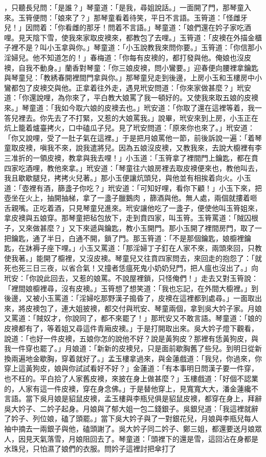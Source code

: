 \begin{showcontents}{}
，只聽長兒問：「是誰？」琴童道：「是我，尋姐說話。」一面開了門，那琴童入來。玉筲便問：「娘來了？」那琴童看着待笑，平日不言語。玉筲道：「怪雌牙兒！」因問着：「你看雌的那牙！問着不言語。」琴童道：「娘們還在妗子家吃酒哩。見天陰下雪，使我來家取皮襖來，都教包了去哩。」玉筲道：「皮襖在外描金櫃子裡不是？叫小玉拿與你。」琴童道：「小玉說教我來問你要。」玉筲道：「你信那小淫婦兒。他不知道怎的！」春梅道：「你每有皮襖的，都打發與他。俺娘也沒皮襖，自我不動身。」蘭香對琴童：「你三娘皮襖，問小鸞要。」迎春便向腰裡拿鑰匙與琴童兒：「教綉春開裡間門拿與你。」那琴童兒走到後邊，上房小玉和玉樓房中小鸞都包了皮襖交與他。正拿着往外走，遇見玳安問道：「你來家做甚麼？」玳安道：「你還說哩，為你來了，平白教大娘罵了我一頓好的。又使我來取五娘的皮襖來。」琴童道：「我如今取六娘的皮襖去也。」玳安道：「你取了還在這裡等着，我一答兒裡去。你先去了不打緊，又惹的大娘罵我。」說畢，玳安來到上房，小玉正在炕上籠着爐臺拷火，口中磕瓜子兒。見了玳安問道：「原來你也來了。」玳安道：「你又說哩，受了一肚子氣在這裡。」于是把月娘罵他一節，前後訴說一遍：「着琴童取皮襖，嗔我不來，說我遣將兒。因為五娘沒皮襖，又教我來，去說大櫥裡有李三准折的一領皮襖，教拿與我去哩！」小玉道：「玉筲拿了裡間門上鑰匙，都在賁四家吃酒哩，教他來拿。」玳安道：「琴童往六娘房裡去取皮襖便來也，教他叫去，我且歇歇腿兒，拷拷火兒著。」那小玉便讓炕頭兒，與他並有相挨着向火。小玉道：「壺裡有酒，篩盞子你吃？」玳安道：「可知好哩，看你下顧！」小玉下來，把壺坐在火上，抽開抽梯，拿了一盞子臘鵝肉 ，篩酒與他。無人處，兩個就摟着咂舌親嘴。正吃着酒，只見琴童兒進來。玳安讓他吃了一盞子，便使他叫玉筲姐來，拿皮襖與五娘穿。那琴童把毡包放下，走到賁四家，叫玉筲。玉筲罵道：「賊囚根子，又來做甚麼？」又下來遞與鑰匙，教小玉開門。那小玉開了裡間房門，取了一把鑰匙，通了半日，白通不開，鎖了門。那玉筲道：「不是那個鑰匙，娘櫥裡鑰匙，在牀褥子座下哩。」小玉又罵道：「那淫婦丁子釘在人家不來，兩頭來回，只教使我著。」能開了櫥裡，又沒皮襖。琴童兒又往賁四家問去，來回走的抱怨了：「就死也死三日三夜，以省合氣！又撞者恁瘟死鬼小奶奶兒門，把人瘟也沒出了。」向玳安：「你說此回去，又惹的娘罵。不說屋裡鎖，只怪俺們！」走去又對玉筲說：「裡間娘櫥裡尋，沒有皮襖。」玉筲想了想笑道：「我也忘記，在外間大櫥裡。」到後邊，又被小玉罵道：「淫婦吃那野漢子搗昏了，皮襖在這裡都到處尋。」一面取出來，將皮襖包了，連大姐披襖，都交付與玳安、琴童兩個，拿到吳大妗子家。月娘又罵道：「賊奴才，你說同了，都不來罷了！」那玳安又不敢言語。琴童道：「娘的皮襖都有了，等着姐又尋這件青廂皮襖。」于是打開取出來。吳大妗子燈下觀看，說道：「也好一件皮襖，五娘你怎的說他不好？說是黃狗皮？那裡有恁黃狗皮，與我一件穿也罷了。」月娘道：「新新的皮襖兒，只是面前歇胸舊了些兒。到明日從新換兩遍地金歇胸，穿着就好了。」孟玉樓拿過來，與金蓮戲道：「我兒，你過來，你穿上這黃狗皮，娘與你試試看好不好？」金蓮道：「有本事明日問漢子要一件穿，也不枉的。平白拾了人家舊皮襖，來披在身上做甚麼？」玉樓戲道：「好個不認業的，人家有這一件皮襖，穿在身念佛。」于是替他穿上，見寬寬大大，潘金蓮纔不言語。當下吳月娘是貂鼠皮襖，孟玉樓與李瓶兒俱是貂鼠皮襖，都穿在身上，拜辭吳大妗子、二妗子起身。月娘與了郁大姐一包二錢銀子。吳銀兒道：「我這裡就辭了妗子、列位娘，磕了頭罷。」當下吳大妗子與了一對銀花兒，月娘與李瓶兒每人袖中摘去一兩銀子與他，磕頭謝了。吳大妗子同二妗子、鄭三姐，都還要送月娘眾人，因見天氣落雪，月娘阻回去了。琴童道：「頭裡下的還是雪，這回沾在身都是水珠兒，只怕濕了娘們的衣服。問妗子這裡討把傘打了
\end{showcontents}
